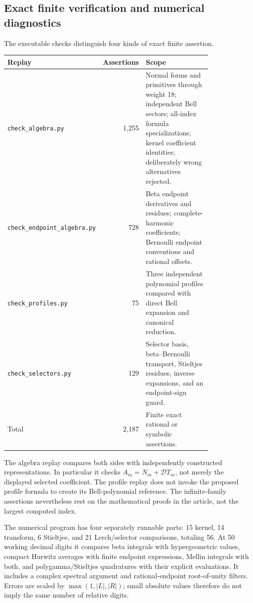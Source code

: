 \documentclass[11pt,letterpaper]{article}
\numberwithin{equation}{section}
\theoremstyle{definition}\newtheorem{definition}[theorem]{Definition}
\theoremstyle{remark}\newtheorem{remark}[theorem]{Remark}
\newcommand{\D}{\mathcal D}\newcommand{\NF}{\mathcal N}\newcommand{\Prim}{\mathcal T}
\newcommand{\src}[1]{\nolinkurl{#1}}
\begin{document}
\subsection{Exact finite verification and numerical diagnostics}
The executable checks distinguish four kinds of exact finite assertion.
\begin{center}
\small
\begin{tabular}{@{}p{0.25\linewidth}rp{0.57\linewidth}@{}}
\toprule
Replay & Assertions & Scope\\
\midrule
\src{check_algebra.py}&1,255&Normal forms and primitives through weight 18;
independent Bell sectors; all-index formula specializations; kernel
coefficient identities; deliberately wrong alternatives rejected.\\[4pt]
\src{check_endpoint_algebra.py}&728&Beta endpoint derivatives and residues;
complete-harmonic coefficients; Bernoulli endpoint conventions and
rational offsets.\\[4pt]
\src{check_profiles.py}&75&Three independent polynomial profiles compared
with direct Bell expansion and canonical reduction.\\[4pt]
\src{check_selectors.py}&129&Selector basis, beta--Bernoulli transport,
Stieltjes residues, inverse expansions, and an endpoint-sign guard.\\
\midrule
Total&2,187&Finite exact rational or symbolic assertions.\\
\bottomrule
\end{tabular}
\end{center}
The algebra replay compares both sides with independently constructed
representations. In particular it checks $A_m=N_m+\D T_m$, not merely
the displayed selected coefficient. The profile replay does not invoke
the proposed profile formula to create its Bell-polynomial reference.
The infinite-family assertions nevertheless rest on the mathematical
proofs in the article, not the largest computed index.

The numerical program has four separately runnable parts: 15 kernel,
14 transform, 6 Stieltjes, and 21 Lerch/selector comparisons, totaling
56. At 50 working decimal digits it compares beta integrals with
hypergeometric values, compact Hurwitz averages with finite endpoint
expressions, Mellin integrals with both, and polygamma/Stieltjes
quadratures with their explicit evaluations. It includes a complex
spectral argument and rational-endpoint root-of-unity filters.
Errors are scaled by $\max(1,|L|,|R|)$; small absolute values therefore
do not imply the same number of relative digits.
\end{document}
